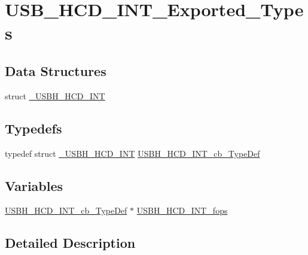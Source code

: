 \hypertarget{group___u_s_b___h_c_d___i_n_t___exported___types}{\section{U\-S\-B\-\_\-\-H\-C\-D\-\_\-\-I\-N\-T\-\_\-\-Exported\-\_\-\-Types}
\label{group___u_s_b___h_c_d___i_n_t___exported___types}
}
\subsection*{Data Structures}
\begin{DoxyCompactItemize}
\item 
struct \hyperlink{struct___u_s_b_h___h_c_d___i_n_t}{\-\_\-\-U\-S\-B\-H\-\_\-\-H\-C\-D\-\_\-\-I\-N\-T}
\end{DoxyCompactItemize}
\subsection*{Typedefs}
\begin{DoxyCompactItemize}
\item 
typedef struct \hyperlink{struct___u_s_b_h___h_c_d___i_n_t}{\-\_\-\-U\-S\-B\-H\-\_\-\-H\-C\-D\-\_\-\-I\-N\-T} \hyperlink{group___u_s_b___h_c_d___i_n_t___exported___types_gaed34bf507c848a5b1723f3a49a4a32dd}{U\-S\-B\-H\-\_\-\-H\-C\-D\-\_\-\-I\-N\-T\-\_\-cb\-\_\-\-Type\-Def}
\end{DoxyCompactItemize}
\subsection*{Variables}
\begin{DoxyCompactItemize}
\item 
\hyperlink{group___u_s_b___h_c_d___i_n_t___exported___types_gaed34bf507c848a5b1723f3a49a4a32dd}{U\-S\-B\-H\-\_\-\-H\-C\-D\-\_\-\-I\-N\-T\-\_\-cb\-\_\-\-Type\-Def} $\ast$ \hyperlink{group___u_s_b___h_c_d___i_n_t___exported___types_ga3e8f69d44475447bb2bd5e5a32b967b9}{U\-S\-B\-H\-\_\-\-H\-C\-D\-\_\-\-I\-N\-T\-\_\-fops}
\end{DoxyCompactItemize}


\subsection{Detailed Description}


